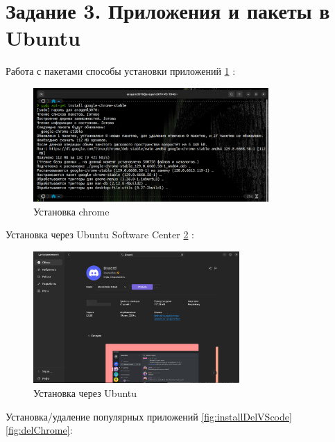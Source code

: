 \section{Задание 3. Приложения и пакеты в Ubuntu}

Работа с пакетами способы установки приложений \ref{fig:installChrome} :

\begin{figure}[!h]
    \centering
    \includegraphics[width = 0.8\textwidth]{images/installChrome.png}
    
    \caption{Установка chrome}
    
    \label{fig:installChrome}
\end{figure}

Установка через Ubuntu Software Center \ref{fig:installDiscord} :

\begin{figure}[!h]
    \centering
    \includegraphics[width = 0.7\textwidth]{images/installDiscord.png}
    
    \caption{Установка через Ubuntu}
    
    \label{fig:installDiscord}
\end{figure}

\newpage

Установка/удаление популярных приложений \ref{fig:installDelVScode} \ref{fig:delChrome}:

